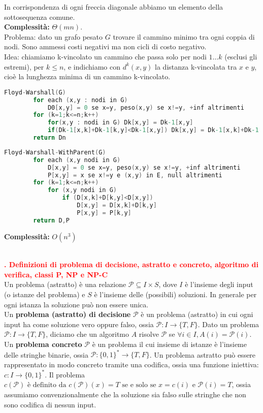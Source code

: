 \documentclass[12pt]{article}
\newcounter{questioncounter}
\newcommand{\question}[1]{
    \stepcounter{questioncounter}
    \textbf{\\\textcolor{red}{\arabic{questioncounter}. #1}}\\
}
\begin{document}
In corrispondenza di ogni freccia diagonale abbiamo un elemento della sottosequenza comune.\\
\textbf{Complessità:} $\Theta(mn)$.\\
Problema: dato un grafo pesato $G$ trovare il cammino minimo tra ogni coppia di nodi. Sono ammessi costi negativi ma non cicli di costo negativo.\\
Idea: chiamiamo k-vincolato un cammino che passa solo per nodi $1\ldots k$ (esclusi gli estremi), per $k\leq n$, e indichiamo con $d^{k}(x,y)$ la distanza k-vincolata tra $x$ e $y$, cioè la lunghezza minima di un cammino k-vincolato.
\begin{lstlisting}[language=C]
    Floyd-Warshall(G)
        for each (x,y : nodi in G)
            D0[x,y] = 0 se x=y, peso(x,y) se x!=y, +inf altrimenti
        for (k=1;k<=n;k++)
            for(x,y : nodi in G) Dk[x,y] = Dk-1[x,y]
            if(Dk-1[x,k]+Dk-1[k,y]<Dk-1[x,y]) Dk[x,y] = Dk-1[x,k]+Dk-1[k,y]
        return Dn
\end{lstlisting}
\begin{lstlisting}[language=C]
    Floyd-Warshall-WithParent(G)
        for each (x,y nodi in G)
            D[x,y] = 0 se x=y, peso(x,y) se x!=y, +inf altrimenti
            P[x,y] = x se x!=y e (x,y) in E, null altrimenti
        for (k=1;k<=n;k++)
            for (x,y nodi in G)
                if (D[x,k]+D[k,y]<D[x,y])
                    D[x,y] = D[x,k]+D[k,y]
                    P[x,y] = P[k,y]
        return D,P
\end{lstlisting}
\textbf{Complessità:} $O(n^{3})$
\question{Definizioni di problema di decisione, astratto e concreto, algoritmo di verifica, classi P, NP e NP-C}
Un problema (astratto) è una relazione $\mathcal{P}\subseteq I\times S$, dove $I$ è l'insieme degli input (o istanze del problema) e $S$ è l'insieme delle (possibili) soluzioni. In generale per ogni istanza la soluzione può non essere unica.\\
Un \textbf{problema (astratto) di decisione} $\mathcal{P}$ è un problema (astratto) in cui ogni input ha come soluzione vero oppure falso, ossia $\mathcal{P}:I\rightarrow \{T,F\}$. Dato un problema $\mathcal{P}:I\rightarrow \{T,F\}$, diciamo che un algoritmo $A$ risolve $\mathcal{P}$ se $\forall i\in I, A(i)=\mathcal{P}(i)$.\\
Un \textbf{problema concreto} $\mathcal{P}$ è un problema il cui insieme di istanze è l'insieme delle stringhe binarie, ossia $\mathcal{P}:\{0,1\}^{*}\rightarrow \{T,F\}$. Un problema astratto può essere rappresentato in modo concreto tramite una codifica, ossia una funzione iniettiva: $c:I\rightarrow \{0,1\}^{*}$. Il problema $c(\mathcal{P}) \text{ è definito da } c(\mathcal{P})(x)=T \text{ se e solo se } x=c(i) \text{ e } \mathcal{P}(i)=T$, ossia assumiamo convenzionalmente che la soluzione sia falso sulle stringhe che non sono codifica di nessun input.\\
\end{document}
